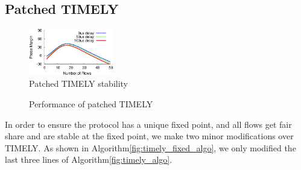 \subsection {Patched TIMELY}

\begin{figure}[t]
\center
\includegraphics[width=0.33\textwidth]{figures/timely_stability.eps}
\caption{Patched TIMELY stability}
\label{fig:timely_stability}
\end{figure}

\begin{figure}[t]
\center
{}
\caption{Performance of patched TIMELY}
\label{fig:timely_unstable}
\end{figure}

In order to ensure the protocol has a unique fixed point, and all flows get fair share and are stable at the fixed point,
we make two minor modifications over TIMELY. As shown in Algorithm\ref{fig:timely_fixed_algo}, we only modified the last
three lines of Algorithm\ref{fig:timely_algo}.

